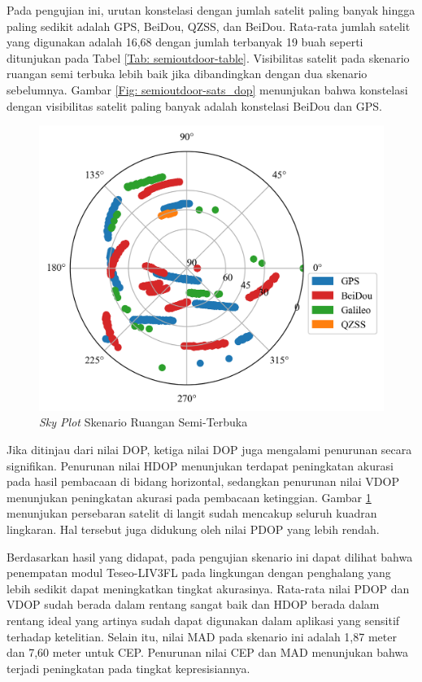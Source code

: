 Pada pengujian ini, urutan konstelasi dengan jumlah satelit paling banyak hingga paling sedikit adalah GPS, BeiDou, QZSS, dan BeiDou. Rata-rata jumlah satelit yang digunakan adalah 16,68 dengan jumlah terbanyak 19 buah seperti ditunjukan pada Tabel \ref{Tab: semioutdoor-table}. Visibilitas satelit pada skenario ruangan semi terbuka lebih baik jika dibandingkan dengan dua skenario sebelumnya. Gambar \ref{Fig: semioutdoor-sats_dop} menunjukan bahwa konstelasi dengan visibilitas satelit paling banyak adalah konstelasi BeiDou dan GPS.

\begin{figure}[H]
	\centering
	\captionsetup{justification=centering}
	\includegraphics[width=12cm]{contents/chapter-4/3-skenario-semioutdoor/sky_plot.png}
	\caption{\textit{Sky Plot} Skenario Ruangan Semi-Terbuka}
	\label{Fig: semioutdoor-sky_plot}
\end{figure}


Jika ditinjau dari nilai DOP, ketiga nilai DOP juga mengalami penurunan secara signifikan. Penurunan nilai HDOP menunjukan terdapat peningkatan akurasi pada hasil pembacaan di bidang horizontal, sedangkan penurunan nilai VDOP menunjukan peningkatan akurasi pada pembacaan ketinggian. Gambar \ref{Fig: semioutdoor-sky_plot} menunjukan persebaran satelit di langit sudah mencakup seluruh kuadran lingkaran. Hal tersebut juga didukung oleh nilai PDOP yang lebih rendah.

Berdasarkan hasil yang didapat, pada pengujian skenario ini dapat dilihat bahwa penempatan modul Teseo-LIV3FL pada lingkungan dengan penghalang yang lebih sedikit dapat meningkatkan tingkat akurasinya. Rata-rata nilai PDOP dan VDOP sudah berada dalam rentang sangat baik dan HDOP berada dalam rentang ideal yang artinya sudah dapat digunakan dalam aplikasi yang sensitif terhadap ketelitian. Selain itu, nilai MAD pada skenario ini adalah 1,87 meter dan 7,60 meter untuk CEP. Penurunan nilai CEP dan MAD menunjukan bahwa terjadi peningkatan pada tingkat kepresisiannya.

